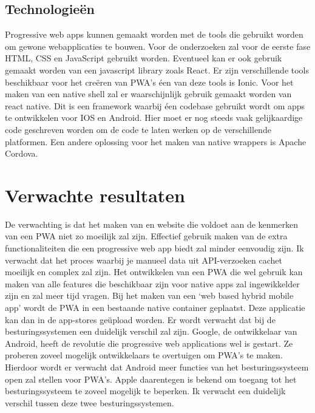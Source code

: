 \subsection{Technologieën}

Progressive web apps kunnen gemaakt worden met de tools die gebruikt worden om gewone webapplicaties te bouwen. 
Voor de onderzoeken zal voor de eerste fase HTML, CSS en JavaScript gebruikt worden. Eventueel kan er ook gebruik gemaakt worden van een javascript library zoals React.
Er zijn verschillende tools beschikbaar voor het creëren van PWA’s éen van deze tools is Ionic.
Voor het maken van een native shell zal er waarschijnlijk gebruik gemaakt worden van react native. Dit is een framework waarbij éen codebase gebruikt wordt om apps te ontwikkelen voor IOS en Android. Hier moet er nog steeds vaak gelijkaardige code geschreven worden om de code te laten werken op de verschillende platformen.
Een andere oplossing voor het maken van native wrappers is Apache Cordova.



\section{Verwachte resultaten}
\label{sec:verwachte_resultaten}


De verwachting is dat het maken van en website die voldoet aan de kenmerken van een PWA niet zo moeilijk zal zijn. Effectief gebruik maken van de extra functionaliteiten die een progressive web app biedt zal minder eenvoudig zijn. Ik verwacht dat het proces waarbij je manueel data uit API-verzoeken cachet moeilijk en complex zal zijn.
Het ontwikkelen van een PWA die wel gebruik kan maken van alle features die beschikbaar zijn voor native apps zal ingewikkelder zijn en zal meer tijd vragen. 
Bij het maken van een ‘web based hybrid mobile app’  wordt de PWA in een bestaande native container geplaatst. Deze applicatie kan dan in de app-stores geüpload worden.
\autocite{Malavolta2016}
Er wordt verwacht dat bij de besturingssystemen een duidelijk verschil zal zijn. 
Google, de ontwikkelaar van Android, heeft de revolutie die progressive web applications wel is gestart. Ze proberen zoveel mogelijk ontwikkelaars te overtuigen om PWA’s te maken. Hierdoor wordt er verwacht dat Android meer functies van het besturingssysteem open zal stellen voor PWA’s.
Apple daarentegen is bekend om toegang tot het besturingssysteem te zoveel mogelijk te beperken. Ik verwacht een duidelijk verschil tussen deze twee besturingssystemen. 
\autocite{Hansen2017}




